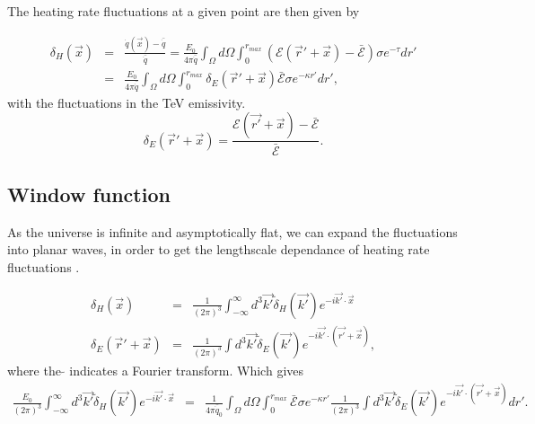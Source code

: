 \documentclass[twocolumns]{emulateapj}
\begin{document}
The heating rate fluctuations at a given point are then given by 

\begin{eqnarray}
  \label{eq:heat_fluc_newt0}
  \delta_H(\vec{x})&=&\frac{\dot{q}(\vec{x})-\bar{\dot{q}}}{\bar{\dot{q}}}=\frac{E_0}{4\pi\bar{\dot{q}}} \int_{\Omega}d\Omega\int_0^{r_{max}}   (\mathcal{E}(\vec{r}'+\vec{x})-\bar{\mathcal{E}}) \sigma  e^{-\tau} dr' \\ \nonumber
  &=&\frac{E_0}{4\pi\bar{\dot{q}}}\int_{\Omega}d\Omega\int_0^{r_{max}}   \delta_E(\vec{r}'+\vec{x})\bar{\mathcal{E}}\sigma  e^{-\kappa r'}dr',\label{eq:fluc_heat_newt0_b}
\end{eqnarray}
with the fluctuations in the TeV emissivity.
\begin{equation}
  \label{eq:fluc_emissivity}
  \delta_E(\vec{r}'+\vec{x})=\frac{\mathcal{E}(\vec{r'}+\vec{x})-\bar{\mathcal{E}}}{\bar{\mathcal{E}}}.
\end{equation}



\subsection{Window function}
As the universe is infinite and asymptotically flat, we can expand the fluctuations into planar waves, in order to get the lengthscale dependance of heating rate fluctuations \citep{2004MNRAS.352..142B}.

\begin{eqnarray}
  \label{eq:FT_delta}
  \delta_H(\vec{x})&=&\frac{1}{(2\pi)^3}\int_{-\infty}^{\infty} d^3\vec{k'} \tilde{\delta}_H(\vec{k'}) e^{-i\vec{k'}\cdot\vec{x}}\label{eq:FFT}\\
  \delta_E(\vec{r}'+\vec{x})&=&\frac{1}{(2\pi)^3}\int d^3\vec{k'} \tilde{\delta}_E(\vec{k'}) e^{-i\vec{k'}\cdot(\vec{r'}+\vec{x})},
\end{eqnarray}
where the $\tilde{}$ indicates a Fourier transform.
Which gives
\begin{eqnarray}
  \label{eq:heat_fluc_newt1}
\frac{E_0}{(2\pi)^3}\int_{-\infty}^{\infty} d^3\vec{k'} \tilde{\delta}_H(\vec{k'}) e^{-i\vec{k'}\cdot\vec{x}}&=&\frac{1}{4\pi\bar{\dot{q}}_0} \int_{\Omega}d\Omega\int_0^{r_{max}}   \bar{\mathcal{E}}\sigma  e^{-\kappa r'}  \frac{1}{(2\pi)^3}\int d^3\vec{k'} \tilde{\delta}_E(\vec{k'}) e^{-i\vec{k'}\cdot(\vec{r'}+\vec{x})} dr'.
\end{eqnarray}

\end{document}
